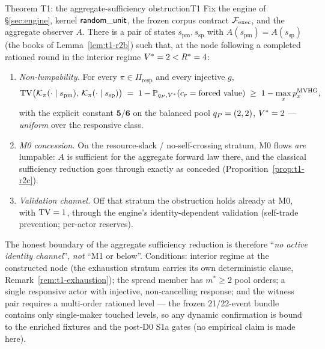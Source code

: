 \begin{preregthm}{Theorem T1: the aggregate-sufficiency obstruction}{T1}
\label{thm:t1-lead}
Fix the engine of \S\ref{sec:engine}, kernel $\mathsf{random\_unit}$, the frozen corpus
contract $\mathcal{F}_{\mathrm{exec}}$, and the aggregate observer $A$. There is a pair of states
$s_{\mathrm{pm}}, s_{\mathrm{sp}}$ with $A(s_{\mathrm{pm}}) =
A(s_{\mathrm{sp}})$ (the books of Lemma~\ref{lem:t1-r2b}) such that, at the
node following a completed rationed round in the interior regime
$V^{*} = 2 < R^{*} = 4$:
\begin{enumerate}
\item[(1)] \emph{Non-lumpability.} For every $\pi \in
\Pi_{\mathrm{resp}}$ and every injective $g$,
\[
\operatorname{TV}\!\big(\mathcal{K}_{\pi}(\cdot \mid s_{\mathrm{pm}}),\,
\mathcal{K}_{\pi}(\cdot \mid s_{\mathrm{sp}})\big)
\;=\; 1 - \mathbb{P}_{q_{P},V^{*}}(c_r = \text{forced value})
\;\geq\; 1 - \max_x p^{\operatorname{MVHG}}_x ,
\]
with the explicit constant $\mathbf{5/6}$ on the balanced pool $q_{P} = (2,2)$,
$V^{*} = 2$ --- \emph{uniform} over the responsive class.
\item[(2)] \emph{M0 concession.} On the resource-slack / no-self-crossing
stratum, M0 flows \emph{are} lumpable: $A$ is sufficient for the aggregate
forward law there, and the classical sufficiency reduction goes through
exactly as conceded (Proposition~\ref{prop:t1-r2c}).
\item[(3)] \emph{Validation channel.} Off that stratum the obstruction holds
already at M0, with $\operatorname{TV} = 1$, through the engine's identity-dependent
validation (self-trade prevention; per-actor reserves).
\end{enumerate}
The honest boundary of the aggregate sufficiency reduction is therefore
``\emph{no active identity channel}'', \emph{not} ``M1 or below''. Conditions:
interior regime at the constructed node (the exhaustion stratum carries its
own deterministic clause, Remark~\ref{rem:t1-exhaustion}); the spread member
has $m^{*} \geq 2$ pool orders; a single responsive actor with injective,
non-cancelling response; and the witness pair requires a multi-order
rationed level --- the frozen 21/22-event bundle contains only single-maker
touched levels, so any dynamic confirmation is bound to the enriched
fixtures and the post-D0 S1a gates (no empirical claim is made here).
\end{preregthm}


